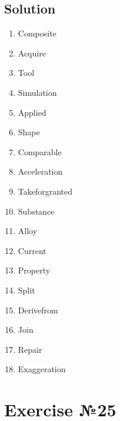 \subsection*{Solution}
\begin{enumerate}
      \item Composite
      \item Acquire
      \item Tool
      \item Simulation
      \item Applied
      \item Shape
      \item Comparable
      \item Acceleration
      \item Takeforgranted
      \item Substance
      \item Alloy
      \item Current
      \item Property
      \item Split
      \item Derivefrom
      \item Join
      \item Repair
      \item Exaggeration
\end{enumerate}

\section{Exercise №25}

